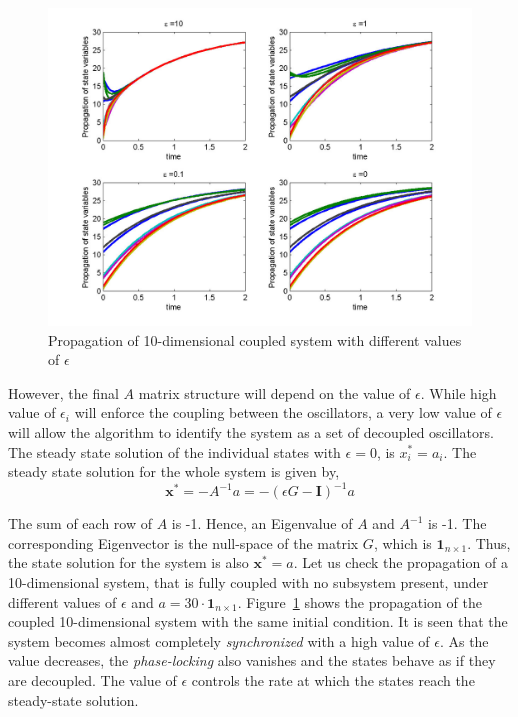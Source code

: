 \begin{figure}[H]
        \centering
        \includegraphics[width=\textwidth]{figures/FIG_11}
        \caption{Propagation of 10-dimensional coupled system with different values of $\epsilon$}\label{linsysts}
\end{figure}

However, the final $A$ matrix structure will depend on the value of $\epsilon$. While high value of $\epsilon_i$ will enforce the coupling between the oscillators, a very low value of $\epsilon$ will allow the algorithm to identify the system as a set of decoupled oscillators. The steady state solution of the individual states with $\epsilon = 0$, is $x_i^* = a_i$. The steady state solution for the whole system is given by,
\begin{equation}
\textbf{x}^* = -A^{-1}a = -(\epsilon G - \textbf{I})^{-1}a
\end{equation}

The sum of each row of $A$ is -1. Hence, an Eigenvalue of $A$ and $A^{-1}$ is -1. The corresponding Eigenvector is the null-space of the matrix $G$, which is $\textbf{1}_{n \times 1}$. Thus, the state solution for the system is also $\textbf{x}^* = a$.
Let us check the propagation of a 10-dimensional system, that is fully coupled with no subsystem present, under different values of $\epsilon$ and $a = 30\cdot\textbf{1}_{n  \times 1}$. Figure~\ref{linsysts} shows the propagation of the coupled 10-dimensional system with the same initial condition. It is seen that the system becomes almost completely \textit{synchronized} with a high value of $\epsilon$. As the value decreases, the \textit{phase-locking} also vanishes and the states behave as if they are decoupled. The value of $\epsilon$ controls the rate at which the states reach the steady-state solution. 

